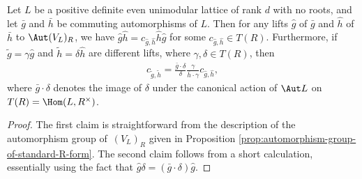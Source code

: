 \begin{lem} \label{lem:lifts-of-commuting-pairs}
Let $L$ be a positive definite even unimodular lattice of rank $d$ with no roots, and let $\bar{g}$ and $\bar{h}$ be commuting automorphisms of $L$. Then for any lifts $\hat{g}$ of $\bar{g}$ and $\hat{h}$ of $\bar{h}$ to $\Aut (V_L)_R$, we have $\hat{g}\hat{h} = c_{\hat{g},\hat{h}} \hat{h} \hat{g}$ for some $c_{\hat{g},\hat{h}} \in T(R)$. Furthermore, if $\tilde{g} = \gamma \hat{g}$ and $\tilde{h} = \delta \hat{h}$ are different lifts, where $\gamma, \delta \in T(R)$, then
\begin{gather*} c_{\tilde{g},\tilde{h}} = \frac{\bar{g} \cdot \delta}{\delta} \frac{\gamma}{\bar{h} \cdot \gamma} c_{\hat{g},\hat{h}}, \end{gather*}
where $\bar{g} \cdot \delta$ denotes the image of $\delta$ under the canonical action of $\Aut L$ on $T(R) = \Hom(L, R^\times)$.
\end{lem}
\begin{proof}
The first claim is straightforward from the description of the automorphism group of~$(V_L)_R$ given in Proposition \ref{prop:automorphism-group-of-standard-R-form}. The second claim follows from a short calculation, essentially using the fact that $\hat{g} \delta = (\bar{g} \cdot \delta) \hat{g}$.
\end{proof}


